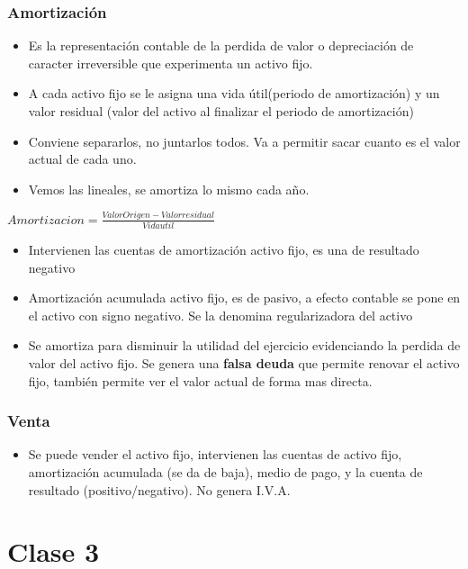 \documentclass[titlepage,a4paper]{article}
\begin{document}
\subsubsection*{Amortización}
\begin{itemize}
\item Es la representación contable de la perdida de valor o depreciación de caracter irreversible que experimenta un activo fijo.
\item A cada activo fijo se le asigna una vida útil(periodo de amortización) y un valor residual (valor del activo al finalizar el periodo de amortización)
\item Conviene separarlos, no juntarlos todos. Va a permitir sacar cuanto es el valor actual de cada uno.
\item Vemos las lineales, se amortiza lo mismo cada año.
\end{itemize}

\begin{center}
\begin{math}
Amortizacion = \frac{Valor Origen - Valor residual}{Vida util}
\end{math}
\end{center}

\begin{itemize}
\item Intervienen las cuentas de amortización activo fijo, es una de resultado negativo
\item Amortización acumulada activo fijo, es de pasivo, a efecto contable se pone en el activo con signo negativo. Se la denomina regularizadora del activo
\item Se amortiza para disminuir la utilidad del ejercicio evidenciando la perdida de valor del activo fijo. Se genera una \textbf{falsa deuda} que permite renovar el activo fijo, también permite ver el valor actual de forma mas directa.
\end{itemize}


\subsubsection*{Venta}
\begin{itemize}
    \item Se puede vender el activo fijo, intervienen las cuentas de activo fijo, amortización acumulada (se da de baja), medio de pago, y la cuenta de resultado (positivo/negativo). No genera I.V.A.
\end{itemize}


\section*{Clase 3}
\end{document}
